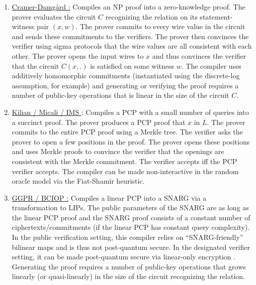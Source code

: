 	\begin{enumerate}[label=\alph*.]
  
	\item \underline{Cramer-Damgård \cite{1998:crypto:zkps-for-finite-field-arithmetic}:} 
	Compiles an NP proof into a zero-knowledge proof. 
	The prover evaluates the circuit $C$ recognizing the relation on its statement-witness pair $(x,w)$. 
	The prover commits to every wire value in the circuit and sends these commitments to the verifiers. 
	The prover then convinces the verifier using sigma protocols that the wire values are all consistent with each other. 
	The prover opens the input wires to $x$ and thus convinces the verifier that the circuit $C(x, .)$ is satisfied on some witness $w$. 
	The compiler uses additively homomorphic commitments (instantiated using the discrete-log assumption, for example) and generating or verifying the proof requires a number of public-key operations that is linear in the size of the circuit $C$.
   
	\item \underline{Kilian \cite{1995:crypto:Improved-Efficient-Arguments} / Micali \cite{2000:SIAM:Computationally-Sound-Proofs} / IMS \cite{2012:tcc:On-Efficient-ZK-PCPs}}: 
	Compiles a PCP with a small number of queries into a succinct proof. 
	The prover produces a PCP proof that $x$ in $L$. 
	The prover commits to the entire PCP proof using a Merkle tree. 
	The verifier asks the prover to open a few positions in the proof. 
	The prover opens these positions and uses Merkle proofs to convince the verifier that the openings are consistent with the Merkle commitment. 
	The verifier accepts iff the PCP verifier accepts. 
	The compiler can be made non-interactive in the random oracle model via the Fiat-Shamir heuristic.
	
  \item \underline{GGPR \cite{2013:QSPs-and-succinct-NIZKs-without-PCPs} / BCIOP \cite{2013:tcc:snargs-via-LIPs}:} 
	Compiles a linear PCP into a SNARG via a transformation to LIPs. 
	The public parameters of the SNARG are as long as the linear PCP proof and the SNARG proof consists of a constant number of ciphertexts/commitments (if the linear PCP has constant query complexity). 
	In the public verification setting, this compiler relies on “SNARG-friendly” bilinear maps and is thus not post-quantum secure. 
	In the designated verifier setting, it can be made post-quantum secure via linear-only encryption \cite{2017:eurocrypt:lattice-based-snargs}. 
	Generating the proof requires a number of public-key operations that grows linearly (or quasi-linearly) in the size of the circuit recognizing the relation.
   

\end{enumerate}
